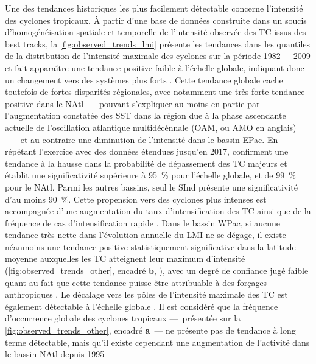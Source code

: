 \documentclass[../main.tex]{subfiles}
\begin{document}
Une des tendances historiques les plus facilement détectable concerne l'intensité des cyclones tropicaux. À partir d'une base de données construite dans un
soucis d'homogénéisation spatiale et temporelle de l'intensité observée des TC issus des best tracks, la \cref{fig:observed_trends_lmi} présente les tendances
dans les quantiles de la distribution de l'intensité maximale des cyclones sur la période \num{1982}~--~\num{2009} et fait apparaître une tendance positive
faible à l'échelle globale, indiquant donc un changement vers des systèmes plus forts \parencite{kossin_trend_2013}. Cette tendance globale cache toutefois de
fortes disparités régionales, avec notamment une très forte tendance positive dans le NAtl ---~pouvant s'expliquer au moins en partie par l'augmentation
constatée des SST dans la région due à la phase ascendante actuelle de l'oscillation atlantique multidécénnale (OAM, ou AMO en anglais)
\parencite{ting_forced_2009}~--- et au contraire une diminution de l'intensité dans le bassin EPac. En répétant l'exercice avec des données étendues jusqu'en
\num{2017}, \cite{kossin_global_2020} confirment une tendance à la hausse dans la probabilité de dépassement des TC majeurs et établit une significativité
supérieure à \SI{95}{\percent} pour l'échelle globale, et de \SI{99}{\percent} pour le NAtl. Parmi les autres bassins, seul le SInd présente une significativité
d'au moins \SI{90}{\percent}. Cette propension vers des cyclones plus intenses est accompagnée d'une augmentation du taux d'intensification des TC ainsi que de
la fréquence de cas d'intensification rapide \parencite{balaguru_increasing_2018,kishtawal_tropical_2012}. Dans le bassin WPac, si aucune tendance très nette
dans l'évolution annuelle du LMI ne se dégage, il existe néanmoins une tendance positive statistiquement significative dans la latitude moyenne auxquelles les
TC atteignent leur maximum d'intensité (\cref{fig:observed_trends_other}, encadré \textbf{b}, \hbox{\cite{kossin_comment_2018}}), avec un degré de confiance
jugé faible quant au  fait que cette tendance puisse être attribuable à des forçages anthropiques \parencite{knutson_tropical_2019}. Le décalage vers les pôles
de l'intensité maximale des TC est également détectable à l'échelle globale \parencite{kossin_poleward_2014}. Il est considéré que la fréquence d'occurrence
globale des cyclones tropicaux ---~présentée sur la \cref{fig:observed_trends_other}, encadré \textbf{a}~--- ne présente pas de tendance à long terme
détectable, mais qu'il existe cependant une augmentation de l'activité dans le bassin NAtl depuis \num{1995}
\end{document}
